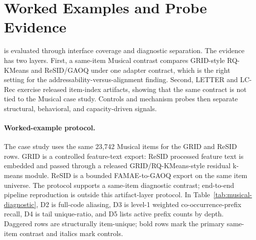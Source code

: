 \section{Worked Examples and Probe Evidence}

\tool is evaluated through interface coverage and diagnostic separation. The
evidence has two layers. First, a same-item Musical
contrast compares GRID-style RQ-KMeans and ReSID/GAOQ under one adapter
contract, which is the right setting for the addressability-versus-alignment
finding. Second, LETTER and LC-Rec exercise released item-index artifacts,
showing that the same contract is not tied to the Musical case study. Controls
and mechanism probes then separate structural, behavioral, and capacity-driven
signals.

\paragraph{Worked-example protocol.}
The case study uses the same 23,742 Musical items for the GRID and ReSID rows.
GRID is a controlled feature-text export: ReSID processed feature text is
embedded and passed through a released GRID/RQ-KMeans-style residual k-means
module. ReSID is a bounded FAMAE-to-GAOQ export on the same item universe. The
protocol supports a same-item diagnostic contrast; end-to-end pipeline
reproduction is outside this artifact-layer protocol.
In Table~\ref{tab:musical-diagnostic}, D2 is full-code aliasing, D3 is level-1
weighted co-occurrence-prefix recall, D4 is tail unique-\sid ratio, and D5
lists active prefix counts by depth. Daggered rows are structurally
item-unique; bold rows mark the primary same-item contrast and italics mark
controls.

